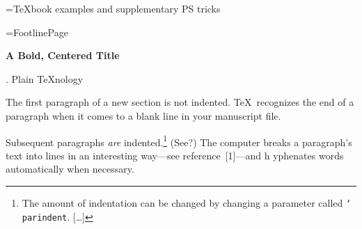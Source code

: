 %
%
%
\headline={\hfil\TeX{}book examples and supplementary PS tricks}

%
\hsize=30pc %
\vsize=52pc %



 
\footline={\tenrm Footline\quad\dotfill\quad Page \folio}
 
\centerline{\bf A Bold, Centered Title}
\smallskip %
. Plain \TeX nology %

The first paragraph of a new section is not indented.
\TeX\ recognizes the end of a paragraph when it comes to a blank
line in your manuscript file. %

Subsequent paragraphs {\it are\/} indented.\footnote*{The amount
    of indentation can be changed by changing a parameter called
{\tt\char`\\parindent}. [\dots]}
(See?) The computer breaks a paragraph's
text into lines in an interesting way---see reference~[1]---and h%
     yphenates words automatically     when necessary.
 
